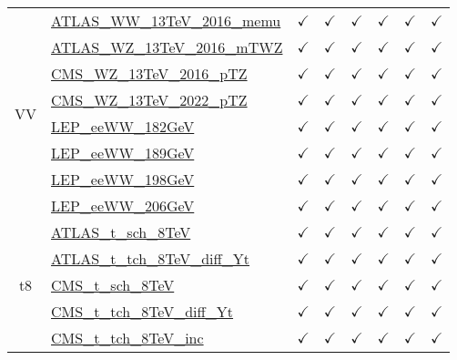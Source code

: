 \documentclass{article}
\begin{document}
\begin{longtable}{|c|l|c|c|c|c|c|c|}
\\ \hline
\multirow{8}{*}{VV}
 & \href{https://arxiv.org}{ATLAS_WW_13TeV_2016_memu}  & $\checkmark$ & $\checkmark$ & $\checkmark$ & $\checkmark$ & $\checkmark$ & $\checkmark$\\ \cline{2-8}
 & \href{https://arxiv.org}{ATLAS_WZ_13TeV_2016_mTWZ}  & $\checkmark$ & $\checkmark$ & $\checkmark$ & $\checkmark$ & $\checkmark$ & $\checkmark$\\ \cline{2-8}
 & \href{https://arxiv.org}{CMS_WZ_13TeV_2016_pTZ}  & $\checkmark$ & $\checkmark$ & $\checkmark$ & $\checkmark$ & $\checkmark$ & $\checkmark$\\ \cline{2-8}
 & \href{https://arxiv.org}{CMS_WZ_13TeV_2022_pTZ}  & $\checkmark$ & $\checkmark$ & $\checkmark$ & $\checkmark$ & $\checkmark$ & $\checkmark$\\ \cline{2-8}
 & \href{https://arxiv.org}{LEP_eeWW_182GeV}  & $\checkmark$ & $\checkmark$ & $\checkmark$ & $\checkmark$ & $\checkmark$ & $\checkmark$\\ \cline{2-8}
 & \href{https://arxiv.org}{LEP_eeWW_189GeV}  & $\checkmark$ & $\checkmark$ & $\checkmark$ & $\checkmark$ & $\checkmark$ & $\checkmark$\\ \cline{2-8}
 & \href{https://arxiv.org}{LEP_eeWW_198GeV}  & $\checkmark$ & $\checkmark$ & $\checkmark$ & $\checkmark$ & $\checkmark$ & $\checkmark$\\ \cline{2-8}
 & \href{https://arxiv.org}{LEP_eeWW_206GeV}  & $\checkmark$ & $\checkmark$ & $\checkmark$ & $\checkmark$ & $\checkmark$ & $\checkmark$
\\ \hline
\multirow{10}{*}{t8}
 & \href{https://arxiv.org}{ATLAS_t_sch_8TeV}  & $\checkmark$ & $\checkmark$ & $\checkmark$ & $\checkmark$ & $\checkmark$ & $\checkmark$\\ \cline{2-8}
 & \href{https://arxiv.org}{ATLAS_t_tch_8TeV_diff_Yt}  & $\checkmark$ & $\checkmark$ & $\checkmark$ & $\checkmark$ & $\checkmark$ & $\checkmark$\\ \cline{2-8}
 & \href{https://arxiv.org}{CMS_t_sch_8TeV}  & $\checkmark$ & $\checkmark$ & $\checkmark$ & $\checkmark$ & $\checkmark$ & $\checkmark$\\ \cline{2-8}
 & \href{https://arxiv.org}{CMS_t_tch_8TeV_diff_Yt}  & $\checkmark$ & $\checkmark$ & $\checkmark$ & $\checkmark$ & $\checkmark$ & $\checkmark$\\ \cline{2-8}
 & \href{https://arxiv.org}{CMS_t_tch_8TeV_inc}  & $\checkmark$ & $\checkmark$ & $\checkmark$ & $\checkmark$ & $\checkmark$ & $\checkmark$\\ \cline{2-8}

\end{longtable}
\end{document}

